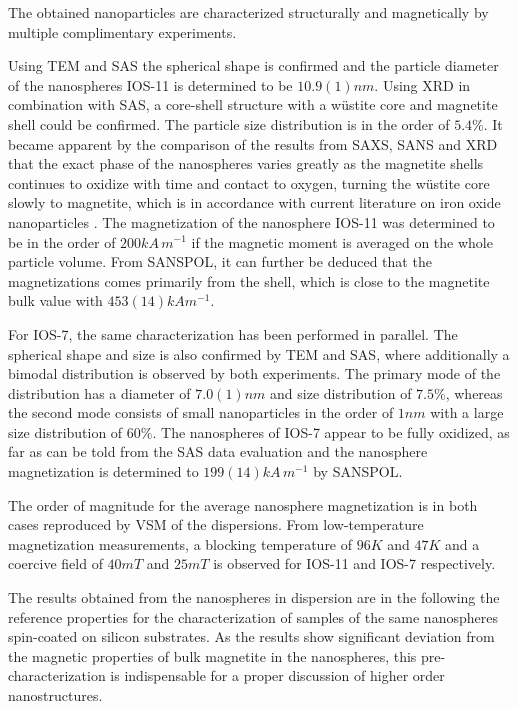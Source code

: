 \documentclass[\main/dresen_thesis.tex]{subfiles}
\begin{document}
  \label{sec:looselyPackedNS:nanoparticle:discussion:summary}
  The obtained nanoparticles are characterized structurally and magnetically by multiple complimentary experiments.

  Using TEM and SAS the spherical shape is confirmed and the particle diameter of the nanospheres IOS-11 is determined to be $10.9(1) \unit{nm}$.
  Using XRD in combination with SAS, a core-shell structure with a w\"ustite core and magnetite shell could be confirmed.
  The particle size distribution is in the order of $5.4 \unit{\%}$.
  It became apparent by the comparison of the results from SAXS, SANS and XRD that the exact phase of the nanospheres varies greatly as the magnetite shells continues to oxidize with time and contact to oxygen, turning the w\"ustite core slowly to magnetite, which is in accordance with current literature on iron oxide nanoparticles .
  The magnetization of the nanosphere IOS-11 was determined to be in the order of $200 \unit{kA \, m^{-1}}$ if the magnetic moment is averaged on the whole particle volume.
  From SANSPOL, it can further be deduced that the magnetizations comes primarily from the shell, which is close to the magnetite bulk value with $453(14) \unit{kA m^{-1}}$.

  For IOS-7, the same characterization has been performed in parallel.
  The spherical shape and size is also confirmed by TEM and SAS, where additionally a bimodal distribution is observed by both experiments.
  The primary mode of the distribution has a diameter of $7.0(1) \unit{nm}$ and size distribution of $7.5 \unit{\%}$, whereas the second mode consists of small nanoparticles in the order of $1 \unit{nm}$ with a large size distribution of $60 \%$.
  The nanospheres of IOS-7 appear to be fully oxidized, as far as can be told from the SAS data evaluation and the nanosphere magnetization is determined to $199(14) \unit{kA \, m^{-1}}$ by SANSPOL.

  The order of magnitude for the average nanosphere magnetization is in both cases reproduced by VSM of the dispersions.
  From low-temperature magnetization measurements, a blocking temperature of $96 \unit{K}$ and $47 \unit{K}$ and a coercive field of $40 \unit{mT}$ and $25 \unit{mT}$ is observed for IOS-11 and IOS-7 respectively.

  The results obtained from the nanospheres in dispersion are in the following the reference properties for the characterization of samples of the same nanospheres spin-coated on silicon substrates.
  As the results show significant deviation from the magnetic properties of bulk magnetite in the nanospheres, this pre-characterization is indispensable for a proper discussion of higher order nanostructures.
\end{document}
